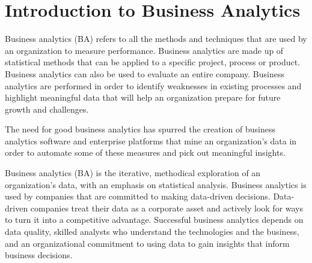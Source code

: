 \section{Introduction to Business Analytics}

Business analytics (BA) refers to all the methods and techniques that are used by an organization to measure performance. Business analytics are made up of statistical methods that can be applied to a specific project, process or product. Business analytics can also be used to evaluate an entire company. Business analytics are performed in order to identify weaknesses in existing processes and highlight meaningful data that will help an organization prepare for future growth and challenges.

The need for good business analytics has spurred the creation of business analytics software and enterprise platforms that mine an organization’s data in order to automate some of these measures and pick out meaningful insights.

Business analytics (BA) is the iterative, methodical exploration of an organization's data, with an emphasis on statistical analysis. Business analytics is used by companies that are committed to making data-driven decisions. Data-driven companies treat their data as a corporate asset and actively look for ways to turn it into a competitive advantage. Successful business analytics depends on data quality, skilled analysts who understand the technologies and the business, and an organizational commitment to using data to gain insights that inform business decisions.